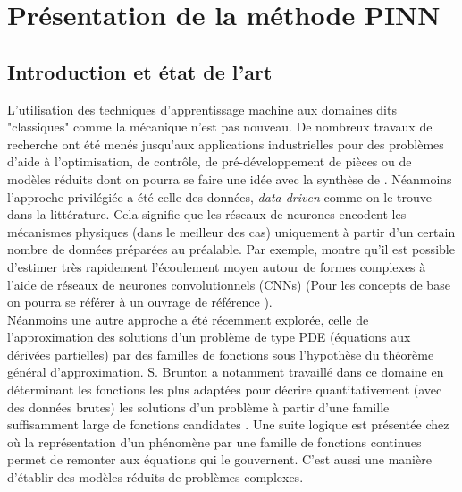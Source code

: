 \section{Présentation de la méthode PINN}

\subsection{Introduction et état de l'art}

L'utilisation des techniques d'apprentissage machine aux domaines dits "classiques" comme la mécanique n'est pas nouveau. De nombreux travaux de recherche ont été menés jusqu'aux applications industrielles pour des problèmes d'aide à l'optimisation, de contrôle, de pré-développement de pièces ou de modèles réduits dont on pourra se faire une idée avec la synthèse de \cite{bruntonMachineLearningFluid2019a}. Néanmoins l'approche privilégiée a été celle des données, \textit{data-driven} comme on le trouve dans la littérature. Cela signifie que les réseaux de neurones encodent les mécanismes physiques (dans le meilleur des cas) uniquement à partir d'un certain nombre de données préparées au préalable. Par exemple,  \cite{guoConvolutionalNeuralNetworks2016} montre qu'il est possible d'estimer très rapidement l'écoulement moyen autour de formes complexes à l'aide de réseaux de neurones convolutionnels (CNNs) (Pour les concepts de base on pourra se référer à un ouvrage de référence \cite{goodfellowDeepLearning2016a}). \\

Néanmoins une autre approche a été récemment explorée, celle de l'approximation des solutions d'un problème de type PDE (équations aux dérivées partielles) par des familles de fonctions sous l'hypothèse du théorème général d'approximation. S. Brunton a notamment travaillé dans ce domaine en déterminant les fonctions les plus adaptées pour décrire quantitativement (avec des données brutes) les solutions d'un problème à partir d'une famille suffisamment large de fonctions candidates \cite{bruntonDiscoveringGoverningEquations2016}. Une suite logique est présentée chez \cite{corbettaApplicationSparseIdentification} où la représentation d'un phénomène par une famille de fonctions continues permet de remonter aux équations qui le gouvernent. C'est aussi une manière d'établir des modèles réduits de problèmes complexes. \\

